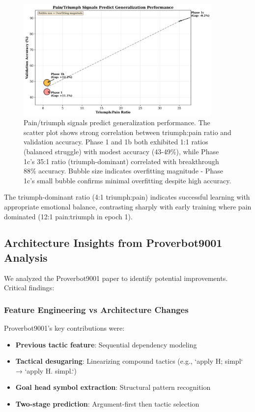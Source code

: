 \documentclass[12pt]{article}
\begin{document}
\begin{figure}[h]
\centering
\includegraphics[width=0.9\textwidth]{figure3_pain_triumph_correlation.png}
\caption{Pain/triumph signals predict generalization performance. The scatter plot shows strong correlation between triumph:pain ratio and validation accuracy. Phase 1 and 1b both exhibited 1:1 ratios (balanced struggle) with modest accuracy (43-49\%), while Phase 1c's 35:1 ratio (triumph-dominant) correlated with breakthrough 88\% accuracy. Bubble size indicates overfitting magnitude - Phase 1c's small bubble confirms minimal overfitting despite high accuracy.}
\label{fig:pain_triumph}
\end{figure}

The triumph-dominant ratio (4:1 triumph:pain) indicates successful learning with appropriate emotional balance, contrasting sharply with early training where pain dominated (12:1 pain:triumph in epoch 1).

\subsection{Architecture Insights from Proverbot9001 Analysis}

We analyzed the Proverbot9001 paper \cite{yang2019learning} to identify potential improvements. Critical findings:

\subsubsection{Feature Engineering vs Architecture Changes}

Proverbot9001's key contributions were:
\begin{itemize}
\item \textbf{Previous tactic feature}: Sequential dependency modeling
\item \textbf{Tactical desugaring}: Linearizing compound tactics (e.g., `apply H; simpl` → `apply H. simpl.`)
\item \textbf{Goal head symbol extraction}: Structural pattern recognition
\item \textbf{Two-stage prediction}: Argument-first then tactic selection
\end{itemize}
\end{document}

